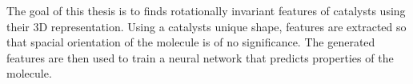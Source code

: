 
\Abstract

The goal of this thesis is to finds rotationally invariant features of catalysts using their 3D representation. 
Using a catalysts unique shape, features are extracted so that spacial orientation of the molecule is of no significance. 
The generated features are then used to train a neural network that predicts properties of the molecule.

